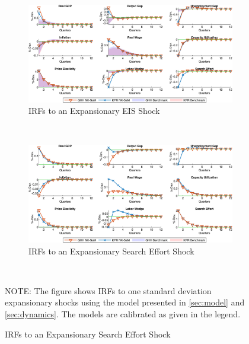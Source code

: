 \documentclass[12pt,3p,authoryear,review]{elsarticle}
\begin{document}
\begin{figure}[h!]%
    \centering%
    \caption{Using GHH Preferences - IRFs to Expansionary Cost Push Shocks}\label{fig:app_irf_robust_ghh_2}%
    \begin{subfigure}{\textwidth}%
        \centering%
        \caption{IRFs to an Expansionary EIS Shock}%
        \includegraphics[width=\textwidth]{fig_26_irf_robust_ghh_eis.png}%
    \end{subfigure}\\%
	\vspace{0.2in}%
    \begin{subfigure}{\textwidth}%
        \centering%
        \caption{IRFs to an Expansionary Search Effort Shock}%
        \includegraphics[width=\textwidth]{fig_27_irf_robust_ghh_search.png}%
    \end{subfigure}\\%
    {\tiny \singlespacing NOTE: The figure shows IRFs to one standard deviation expansionary shocks using the model presented in \cref{sec:model} and \cref{sec:dynamics}. The models are calibrated as given in the legend.\par}%
\end{figure}%
\FloatBarrier%
\end{document}
